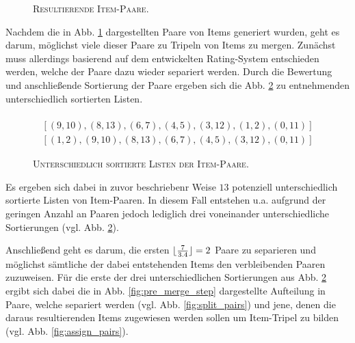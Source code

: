 \begin{figure}[H]
\centering
{}
\caption{\textsc{Resultierende Item-Paare}.}
\label{fig:item_pairs_example_b=3}
\end{figure}

Nachdem die in Abb. \ref{fig:item_pairs_example_b=3} dargestellten Paare von Items generiert wurden, geht es darum,
möglichst viele dieser Paare zu Tripeln von Items zu mergen. Zunächst muss allerdings basierend auf dem entwickelten Rating-System
entschieden werden, welche der Paare dazu wieder separiert werden. Durch die Bewertung und anschließende Sortierung der Paare
ergeben sich die Abb. \ref{fig:lists_of_pairs} zu entnehmenden unterschiedlich sortierten Listen.
\begin{figure}[H]
\begin{gather*}
  [(1, 2), (3, 12), (9, 10), (8, 13), (6, 7), (4, 5), (0, 11)] \\
  [(9, 10), (8, 13), (6, 7), (4, 5), (3, 12), (1, 2), (0, 11)] \\
  [(1, 2), (9, 10), (8, 13), (6, 7), (4, 5), (3, 12), (0, 11)]
\end{gather*}
\caption{\textsc{Unterschiedlich sortierte Listen der Item-Paare}.}
\label{fig:lists_of_pairs}
\end{figure}
Es ergeben sich dabei in zuvor beschriebenr Weise $13$ potenziell unterschiedlich sortierte Listen von Item-Paaren.
In diesem Fall entstehen u.a. aufgrund der geringen Anzahl an Paaren jedoch lediglich drei voneinander unterschiedliche
Sortierungen (vgl. Abb. \ref{fig:lists_of_pairs}).

Anschließend geht es darum, die ersten $\lfloor\frac{7}{3.4}\rfloor = 2$ Paare zu separieren und möglichst sämtliche der dabei entstehenden
Items den verbleibenden Paaren zuzuweisen. Für die erste der drei unterschiedlichen Sortierungen aus Abb. \ref{fig:lists_of_pairs}
ergibt sich dabei die in Abb. \ref{fig:pre_merge_step} dargestellte Aufteilung in Paare, welche separiert werden
(vgl. Abb. \ref{fig:split_pairs}) und jene, denen die daraus resultierenden Items zugewiesen werden sollen um Item-Tripel zu bilden
(vgl. Abb. \ref{fig:assign_pairs}).

